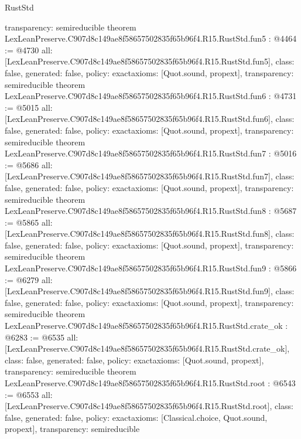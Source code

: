 \begin{lexlean}{RustStd}
\begin{coremodule}
{  transparency: semireducible
}
theorem LexLeanPreserve.C907d8c149ae8f58657502835f65b96f4.R15.RustStd.fun5 : @4464 := @4730 {
  all: [LexLeanPreserve.C907d8c149ae8f58657502835f65b96f4.R15.RustStd.fun5],
  class: false,
  generated: false,
  policy: exact{axioms: [Quot.sound, propext]},
  transparency: semireducible
}
theorem LexLeanPreserve.C907d8c149ae8f58657502835f65b96f4.R15.RustStd.fun6 : @4731 := @5015 {
  all: [LexLeanPreserve.C907d8c149ae8f58657502835f65b96f4.R15.RustStd.fun6],
  class: false,
  generated: false,
  policy: exact{axioms: [Quot.sound, propext]},
  transparency: semireducible
}
theorem LexLeanPreserve.C907d8c149ae8f58657502835f65b96f4.R15.RustStd.fun7 : @5016 := @5686 {
  all: [LexLeanPreserve.C907d8c149ae8f58657502835f65b96f4.R15.RustStd.fun7],
  class: false,
  generated: false,
  policy: exact{axioms: [Quot.sound, propext]},
  transparency: semireducible
}
theorem LexLeanPreserve.C907d8c149ae8f58657502835f65b96f4.R15.RustStd.fun8 : @5687 := @5865 {
  all: [LexLeanPreserve.C907d8c149ae8f58657502835f65b96f4.R15.RustStd.fun8],
  class: false,
  generated: false,
  policy: exact{axioms: [Quot.sound, propext]},
  transparency: semireducible
}
theorem LexLeanPreserve.C907d8c149ae8f58657502835f65b96f4.R15.RustStd.fun9 : @5866 := @6279 {
  all: [LexLeanPreserve.C907d8c149ae8f58657502835f65b96f4.R15.RustStd.fun9],
  class: false,
  generated: false,
  policy: exact{axioms: [Quot.sound, propext]},
  transparency: semireducible
}
theorem LexLeanPreserve.C907d8c149ae8f58657502835f65b96f4.R15.RustStd.crate_ok : @6283 := @6535 {
  all: [LexLeanPreserve.C907d8c149ae8f58657502835f65b96f4.R15.RustStd.crate_ok],
  class: false,
  generated: false,
  policy: exact{axioms: [Quot.sound, propext]},
  transparency: semireducible
}
theorem LexLeanPreserve.C907d8c149ae8f58657502835f65b96f4.R15.RustStd.root : @6543 := @6553 {
  all: [LexLeanPreserve.C907d8c149ae8f58657502835f65b96f4.R15.RustStd.root],
  class: false,
  generated: false,
  policy: exact{axioms: [Classical.choice, Quot.sound, propext]},
  transparency: semireducible
}


\end{coremodule}
\end{lexlean}
